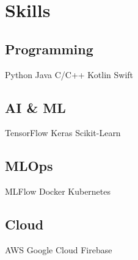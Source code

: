 \section{Skills}
\subsection{Programming}
Python \textbullet{} Java \textbullet{} C/C++ \textbullet{} Kotlin \textbullet{} Swift
\sectionsep

\subsection{AI \& ML}
TensorFlow \textbullet{} Keras \textbullet{} Scikit-Learn
\sectionsep

\subsection{MLOps}
MLFlow \textbullet{} Docker \textbullet{} Kubernetes
\sectionsep

\subsection{Cloud}
AWS \textbullet{} Google Cloud \textbullet{} Firebase
\sectionsep
